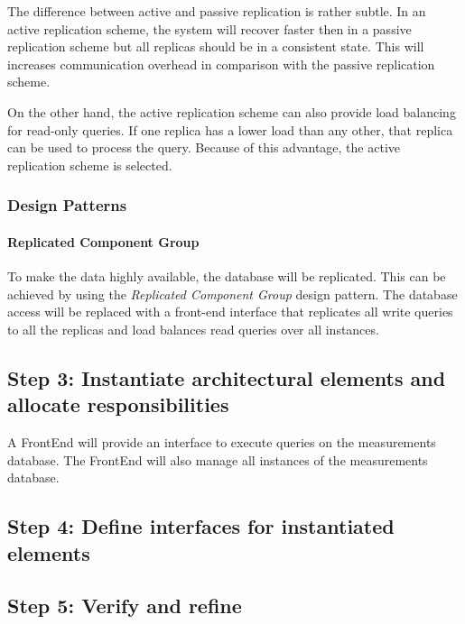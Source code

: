 \npar The difference between active and passive replication is rather subtle.
In an active replication scheme, the system will recover faster then in a
passive replication scheme but all replicas should be in a consistent
state. This will increases communication overhead in comparison with the
passive replication scheme.

\npar On the other hand, the active replication scheme can also provide load
balancing for read-only queries. If one replica has a lower load than any other,
that replica can be used to process the query. Because of this advantage, the
active replication scheme is selected.

\subsubsection{Design Patterns}
\label{add:it4/patterns}

\paragraph{Replicated Component Group} 

\npar To make the data highly available, the database will be replicated. This
can be achieved by using the \emph{Replicated Component Group} design pattern.
The database access will be replaced with a front-end interface that replicates
all write queries to all the replicas and load balances read queries over all
instances.

\subsection{Step 3: Instantiate architectural elements and allocate responsibilities}
\label{add:it4/elements}

\npar A FrontEnd will provide an interface to execute queries on the
measurements database. The FrontEnd will also manage all instances of the
measurements database.

\subsection{Step 4: Define interfaces for instantiated elements}
\label{add:it4/interfaces}


\subsection{Step 5: Verify and refine}
\label{add:it4/verification}

